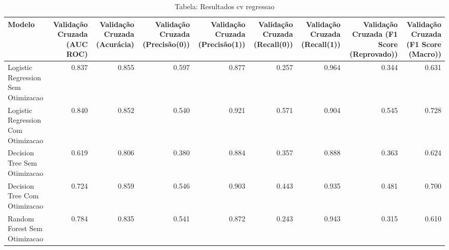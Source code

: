 \begin{table}[H] %
    \centering
    \caption{Tabela: Resultados cv regressao}
    \label{tab:resultados_cv_regressao}
    \renewcommand{\arraystretch}{1.25} %
    \begin{adjustwidth}{ -1in }{ -1in } %
    \centering %
    \small %
    \begin{tabular}{lrrrrrrrr}
\toprule
                            Modelo &  Validação Cruzada (AUC ROC) &  Validação Cruzada (Acurácia) &  Validação Cruzada (Precisão(0)) &  Validação Cruzada (Precisão(1)) &  Validação Cruzada (Recall(0)) &  Validação Cruzada (Recall(1)) &  Validação Cruzada (F1 Score (Reprovado)) &  Validação Cruzada (F1 Score (Macro)) \\
\midrule
Logistic Regression Sem Otimizacao &                        0.837 &                         0.855 &                            0.597 &                            0.877 &                          0.257 &                          0.964 &                                     0.344 &                                 0.631 \\
Logistic Regression Com Otimizacao &                        0.840 &                         0.852 &                            0.540 &                            0.921 &                          0.571 &                          0.904 &                                     0.545 &                                 0.728 \\
      Decision Tree Sem Otimizacao &                        0.619 &                         0.806 &                            0.380 &                            0.884 &                          0.357 &                          0.888 &                                     0.363 &                                 0.624 \\
      Decision Tree Com Otimizacao &                        0.724 &                         0.859 &                            0.546 &                            0.903 &                          0.443 &                          0.935 &                                     0.481 &                                 0.700 \\
      Random Forest Sem Otimizacao &                        0.784 &                         0.835 &                            0.541 &                            0.872 &                          0.243 &                          0.943 &                                     0.315 &                                 0.610 \\

\end{tabular}
\end{adjustwidth}
\end{table}
